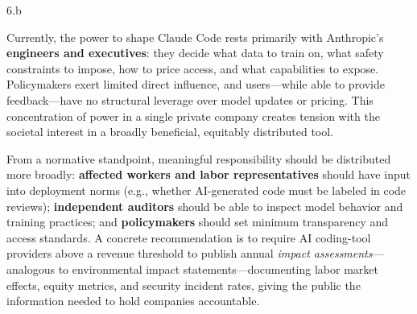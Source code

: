 \LARGE
6.b
\normalsize

\begin{answer}
  Currently, the power to shape Claude Code rests primarily with Anthropic's \textbf{engineers and executives}: they decide what data to train on, what safety constraints to impose, how to price access, and what capabilities to expose. Policymakers exert limited direct influence, and users---while able to provide feedback---have no structural leverage over model updates or pricing. This concentration of power in a single private company creates tension with the societal interest in a broadly beneficial, equitably distributed tool.

  From a normative standpoint, meaningful responsibility should be distributed more broadly: \textbf{affected workers and labor representatives} should have input into deployment norms (e.g., whether AI-generated code must be labeled in code reviews); \textbf{independent auditors} should be able to inspect model behavior and training practices; and \textbf{policymakers} should set minimum transparency and access standards. A concrete recommendation is to require AI coding-tool providers above a revenue threshold to publish annual \textit{impact assessments}---analogous to environmental impact statements---documenting labor market effects, equity metrics, and security incident rates, giving the public the information needed to hold companies accountable.
\end{answer}
\clearpage


